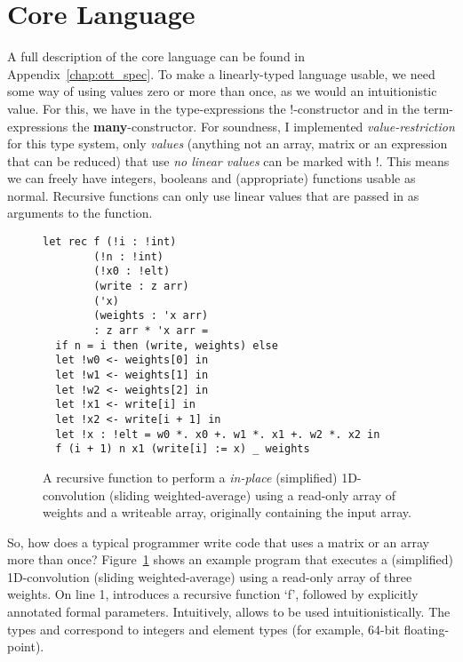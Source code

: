 \section{Core Language}

A full description of the core language can be found in
Appendix~\ref{chap:ott_spec}. To make a linearly-typed language usable, we need
some way of using values zero or more than once, as we would an intuitionistic
value. For this, we have in the type-expressions the !-constructor and in the
term-expressions the \textbf{many}-constructor. For soundness, I implemented
\emph{value-restriction} for this type system, only \emph{values} (anything not
an array, matrix or an expression that can be reduced) that use \emph{no linear
values} can be marked with !. This means we can freely have integers, booleans
and (appropriate) functions usable as normal. Recursive functions can only use
linear values that are passed in as arguments to the function.

\begin{figure}[tb]
    \begin{verbatim}
let rec f (!i : !int)
        (!n : !int)
        (!x0 : !elt)
        (write : z arr)
        ('x)
        (weights : 'x arr)
        : z arr * 'x arr =
  if n = i then (write, weights) else
  let !w0 <- weights[0] in
  let !w1 <- weights[1] in
  let !w2 <- weights[2] in
  let !x1 <- write[i] in
  let !x2 <- write[i + 1] in
  let !x : !elt = w0 *. x0 +. w1 *. x1 +. w2 *. x2 in
  f (i + 1) n x1 (write[i] := x) _ weights
    \end{verbatim}

    \caption{A recursive function to perform a \emph{in-place} (simplified)
        1D-convolution (sliding weighted-average) using a read-only array of
        weights and a writeable array, originally containing the input
        array.}\label{fig:oned_conv}

\end{figure}

So, how does a typical programmer write code that uses a matrix or an array
more than once? Figure~\ref{fig:oned_conv} shows an example program that
executes a (simplified) 1D-convolution (sliding weighted-average) using a
read-only array of three weights. On line 1,  introduces a
recursive function `f', followed by explicitly annotated formal parameters.
Intuitively,  allows  to be used intuitionistically. The
types  and  correspond to integers and element types
(for example, 64-bit floating-point).

